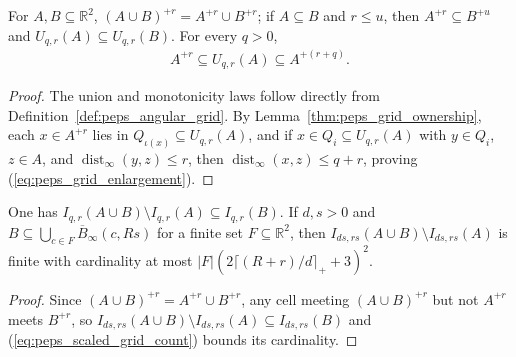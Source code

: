 \begin{lemma}
    \label{thm:peps_grid_enlargement}
    \leanok
    For $A,B\subseteq\mathbb R^2$, $(A\cup B)^{+r}=A^{+r}\cup B^{+r}$; if
    $A\subseteq B$ and $r\le u$, then $A^{+r}\subseteq B^{+u}$ and
    $U_{q,r}(A)\subseteq U_{q,r}(B)$. For every $q>0$,
    \begin{align}
        A^{+r}\subseteq U_{q,r}(A)\subseteq A^{+(r+q)}.
        \label{eq:peps_grid_enlargement}
    \end{align}
\end{lemma}
\begin{proof}
    \leanok
    The union and monotonicity laws follow directly from
    Definition~\ref{def:peps_angular_grid}. By Lemma~\ref{thm:peps_grid_ownership},
    each $x\in A^{+r}$ lies in $Q_{\iota(x)}\subseteq U_{q,r}(A)$, and if
    $x\in Q_i\subseteq U_{q,r}(A)$ with $y\in Q_i$, $z\in A$, and
    $\operatorname{dist}_{\infty}(y,z)\le r$, then
    $\operatorname{dist}_{\infty}(x,z)\le q+r$, proving
    (\ref{eq:peps_grid_enlargement}).
\end{proof}

\begin{lemma}
    \label{thm:peps_new_cell_count}
    \leanok
    One has $I_{q,r}(A\cup B)\setminus I_{q,r}(A)\subseteq I_{q,r}(B)$. If
    $d,s>0$ and $B\subseteq\bigcup_{c\in F}\overline B_\infty(c,Rs)$ for a finite
    set $F\subseteq\mathbb R^2$, then $I_{ds,rs}(A\cup B)\setminus I_{ds,rs}(A)$
    is finite with cardinality at most $|F|(2\lceil(R+r)/d\rceil_++3)^2$.
\end{lemma}
\begin{proof}
    \leanok
    Since $(A\cup B)^{+r}=A^{+r}\cup B^{+r}$, any cell meeting $(A\cup B)^{+r}$
    but not $A^{+r}$ meets $B^{+r}$, so
    $I_{ds,rs}(A\cup B)\setminus I_{ds,rs}(A)\subseteq I_{ds,rs}(B)$ and
    (\ref{eq:peps_scaled_grid_count}) bounds its cardinality.
\end{proof}

